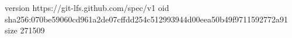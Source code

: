 version https://git-lfs.github.com/spec/v1
oid sha256:070be59060cd961a2de07cffdd254c512993944d00eea50b49f9711592772a91
size 271509
